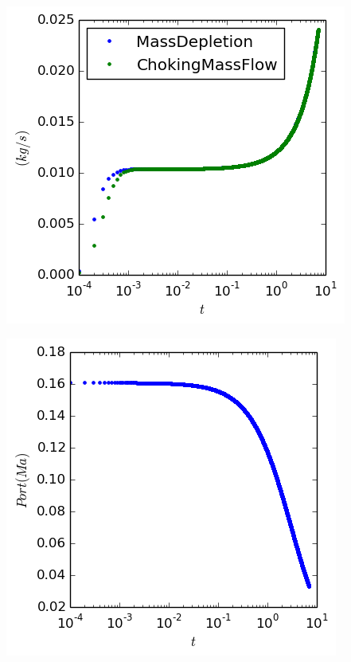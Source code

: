 \documentclass[cleanfoot,cleanhead,twocolumn,10pt,notitlepage]{asme2e}
\begin{document}
\includegraphics[width=\linewidth]{../python_stuff/Part1/MassFlows.png}

\includegraphics[width=\linewidth]{../python_stuff/Part1/PortMach.png}
\end{document}
